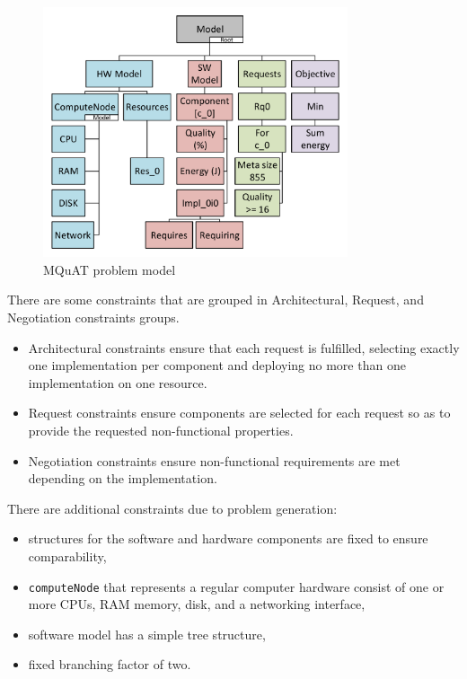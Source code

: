\begin{figure}
	\centering
	\includegraphics[width=0.8\textwidth]{images/MQuATModel.pdf}
	\caption[MQuAT problem model]{MQuAT problem model}
	\label{fig:mquatmodel}
\end{figure}



There are some constraints that are grouped in Architectural, Request, and Negotiation constraints groups.

\begin{itemize}
	\item Architectural constraints ensure that each request is fulfilled, selecting exactly one implementation per component and deploying no more than one implementation on one resource.
	\item Request constraints ensure components are selected for each request so as to provide the requested non-functional properties.
	\item Negotiation constraints ensure non-functional requirements are met depending on the implementation.
\end{itemize}

There are additional constraints due to problem generation:

\begin{itemize}
	\item structures for the software and hardware components are fixed to ensure comparability,
	\item \texttt{computeNode} that represents a regular computer hardware consist of one or more CPUs, RAM memory, disk, and a networking interface,
	\item software model has a simple tree structure,
	\item fixed branching factor of two.
\end{itemize}

